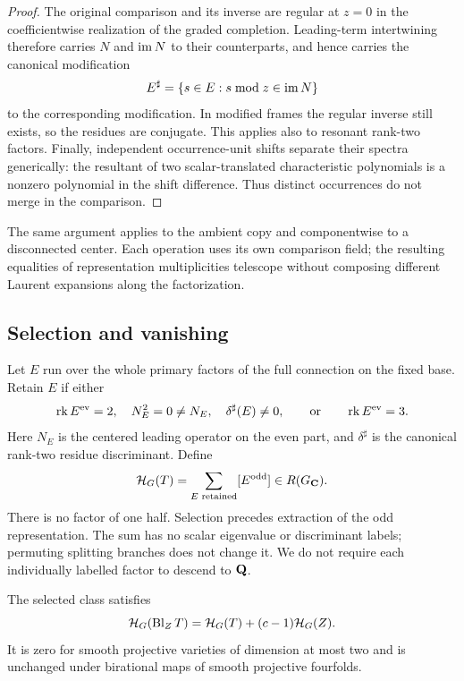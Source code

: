 \begin{proof}
The original comparison and its inverse are regular at $z=0$ in the
coefficientwise realization of the graded completion. Leading-term
intertwining therefore carries $N$ and $\operatorname{im} N$ to their counterparts,
and hence carries the canonical modification
\[
 E^\sharp=\{s\in E:s\bmod z\in\operatorname{im} N\}
\]
to the corresponding modification. In modified frames the regular inverse
still exists, so the residues are conjugate. This applies also to resonant
rank-two factors. Finally, independent occurrence-unit shifts separate
their spectra generically: the resultant of two scalar-translated
characteristic polynomials is a nonzero polynomial in the shift difference.
Thus distinct occurrences do not merge in the comparison.
%
%
\end{proof}

The same argument applies to the ambient copy and componentwise to a
disconnected center. Each operation uses its own comparison field; the
resulting equalities of representation multiplicities telescope without
composing different Laurent expansions along the factorization.

\subsection{Selection and vanishing}

Let $E$ run over the whole primary factors of the full connection on the
fixed base. Retain $E$ if either
\[
 \operatorname{rk} E^{\mathrm{ev}}=2,\quad N_E^2=0\ne N_E,\quad\delta^\sharp(E)\ne0,
 \qquad\text{or}\qquad \operatorname{rk} E^{\mathrm{ev}}=3.
\]
Here $N_E$ is the centered leading operator on the even part, and
$\delta^\sharp$ is the canonical rank-two residue discriminant. Define
\[
 \mathcal H_G(T)=\sum_{E\text{ retained}}[E^{\mathrm{odd}}]\in R(G_\mathbf C).
\]
There is no factor of one half. Selection precedes extraction of the odd
representation. The sum has no scalar eigenvalue or discriminant labels;
permuting splitting branches does not change it. We do not require each
individually labelled factor to descend to $\mathbf Q$.

\begin{proposition}
\label{prop:hodge-operations}%
The selected class satisfies
\[
 \mathcal H_G(\operatorname{Bl}_ZT)=\mathcal H_G(T)+(c-1)\mathcal H_G(Z).
\]
It is zero for smooth projective varieties of dimension at most two and
is unchanged under birational maps of smooth projective fourfolds.
\end{proposition}

